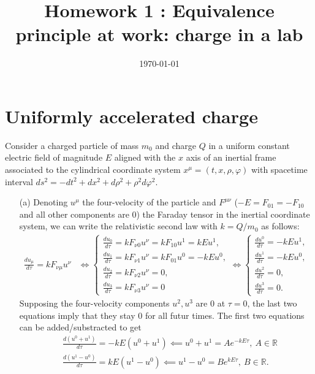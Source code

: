 \documentclass[10pt, a4paper]{article}
\title{Homework 1 : Equivalence principle at
work: charge in a lab} %
\author{\PA} %
\date{\today} %
\begin{document}
\maketitlepage

\maketableofcontents


\section{Uniformly accelerated charge}
Consider a charged particle of mass $m_0$ and charge $Q$ in a uniform constant electric field of magnitude $E$ aligned with the $x$ axis of an inertial frame associated to the cylindrical coordinate system $x^\mu = (t, x, \rho, \varphi)$ with spacetime interval $d s^2=-d t^2+d x^2+d \rho^2+\rho^2 d \varphi^2$. 
\begin{enumerate}
  \item[(a)] Denoting $u^{\mu}$ the four-velocity of the particle and $F^{\mu\nu}$ ($-E = F_{01} = -F_{10}$ and all other components are $0$) the Faraday tensor in the inertial coordinate system, we can write the relativistic second law with $k=Q / m_0$ as follows: 
  \begin{align*}
    \frac{d u_\mu}{d \tau}=k F_{\nu\mu} u^\nu &\iff 
    \begin{cases}
      \frac{d u_0}{d \tau}=k F_{\nu 0} u^\nu= k F_{1 0} u^1 = kE u^1,\\
      \frac{d u_1}{d \tau}=k F_{\nu 1} u^\nu = k F_{0 1} u^0 = -kE u^{0},\\
      \frac{d u_2}{d \tau}=k F_{\nu 2} u^\nu = 0,\\
      \frac{d u_3}{d \tau}=k F_{\nu 3} u^\nu = 0
    \end{cases}
    \iff 
    \begin{cases}
      \frac{d u^0}{d \tau} = -kE u^1,\\
      \frac{d u^1}{d \tau} = -kE u^{0},\\
      \frac{d u^2}{d \tau}= 0,\\
      \frac{d u^3}{d \tau} = 0.
    \end{cases}
  \end{align*} 
  Supposing the four-velocity components $u^2, u^3$ are $0$ at $\tau = 0$, the last two equations imply that they stay $0$ for all futur times. The first two equations can be added/substracted to get 
  \begin{align*}
    &\frac{d (u^0 + u^{1})}{d \tau} = -kE (u^{0} + u^1) \impliedby u^{0} + u^1 = A e^{-kE \tau},\  A\in \mathbb{R}\\
    &\frac{d (u^1-u^{0})}{d \tau} = kE (u^1 - u^{0}) \impliedby u^{1} - u^0 = B e^{kE \tau},\ B\in \mathbb{R}.

\end{align*}
\end{enumerate}
\end{document}
